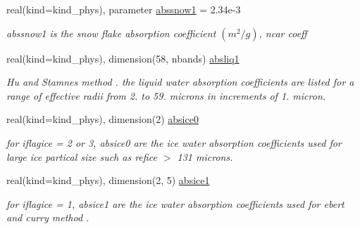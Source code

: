 \begin{DoxyCompactItemize}
real(kind=kind\+\_\+phys), parameter \hyperlink{namespacemodule__radlw__cldprlw_a7d12b328d9dec0c525a4b0824ae7ab44}{abssnow1} = 2.\+34e-\/3
\begin{DoxyCompactList}\small\item\em abssnow1 is the snow flake absorption coefficient $(m^{2}/g)$, ncar coeff \end{DoxyCompactList}\item 
\mbox{\label{namespacemodule__radlw__cldprlw_a57896538226e9184c3750440d9f62166}} 
real(kind=kind\+\_\+phys), dimension(58, nbands) \hyperlink{namespacemodule__radlw__cldprlw_a57896538226e9184c3750440d9f62166}{absliq1}
\begin{DoxyCompactList}\small\item\em Hu and Stamnes method \cite{hu_and_stamnes_1993} . the liquid water absorption coefficients are listed for a range of effective radii from 2. to 59. microns in increments of 1. micron. \end{DoxyCompactList}\item 
\mbox{\label{namespacemodule__radlw__cldprlw_a6610d37cab9ccd4de89237c5de536cfb}} 
real(kind=kind\+\_\+phys), dimension(2) \hyperlink{namespacemodule__radlw__cldprlw_a6610d37cab9ccd4de89237c5de536cfb}{absice0}
\begin{DoxyCompactList}\small\item\em for iflagice = 2 or 3, absice0 are the ice water absorption coefficients used for large ice partical size such as refice $>$ 131 microns. \end{DoxyCompactList}\item 
\mbox{\label{namespacemodule__radlw__cldprlw_a3b86ff9d6791d95170d3b3ab61cd8291}} 
real(kind=kind\+\_\+phys), dimension(2, 5) \hyperlink{namespacemodule__radlw__cldprlw_a3b86ff9d6791d95170d3b3ab61cd8291}{absice1}
\begin{DoxyCompactList}\small\item\em for iflagice = 1, absice1 are the ice water absorption coefficients used for ebert and curry method \cite{ebert_and_curry_1992} . \end{DoxyCompactList}\item 
\mbox{\label{namespacemodule__radlw__cldprlw_ad2238686c0e6d1c5d74bcfdde1542e1d}} 

\end{DoxyCompactItemize}
